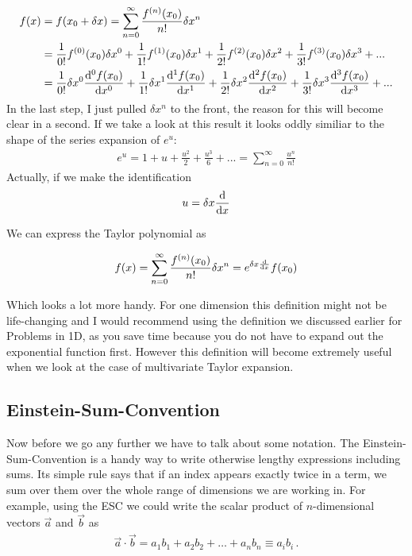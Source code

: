 \begin{align*}
	f(x)&=f(x_0+\delta x)= \sum_{n=0}^\infty \frac{f^{(n)}(x_0)}{n!}\delta x^n\\
		&= \frac{1}{0!}f^{(0)}(x_0)\delta x^0 + \frac{1}{1!} f^{(1)}(x_0)\delta x^1 +  \frac{1}{2!}f^{(2)}(x_0)\delta x^2 + \frac{1}{3!} f^{(3)}(x_0)\delta x^3 + ...\\
	&= \frac{1}{0!}\delta x^0 \dv[0]{f(x_0)}{x} + \frac{1}{1!} \delta x^1\dv[1]{f(x_0)}{x} +  \frac{1}{2!}\delta x^2\dv[2]{f(x_0)}{x} + \frac{1}{3!} \delta x^3\dv[3]{f(x_0)}{x} + ...\\
\end{align*}
In the last step, I just pulled $\delta x^n$ to the front, the reason for this will become clear in a second. If we take a look at this result it looks oddly similiar to the shape of the series expansion of $e^u$:
\begin{align}
	e^u = 1+u+\frac{u^2}{2}+\frac{u^3}{6}+... = \sum_{n=0}^{\infty} \frac{u^n}{n!}
\end{align}
Actually, if we make the identification
\begin{align*}
	u = \delta x \dv{}{x}
\end{align*}

We can express the Taylor polynomial as 

\begin{align}
f(x)&= \sum_{n=0}^\infty \frac{f^{(n)}(x_0)}{n!}\delta x^n = e^{\delta x \dv{}{x}}f(x_0)\\
\end{align}

Which looks a lot more handy. For one dimension this definition might not be life-changing and I would recommend using the definition we discussed earlier for Problems in 1D, as you save time because you do not have to expand out the exponential function first. However this definition will become extremely useful when we look at the case of multivariate Taylor expansion. 
\subsection{Einstein-Sum-Convention}
Now before we go any further we have to talk about some notation. The Einstein-Sum-Convention is a handy way to write otherwise lengthy expressions including sums. Its simple rule says that if an index appears exactly twice in a term, we sum over them over the whole range of dimensions we are working in. For example, using the ESC we could write the scalar product of $n$-dimensional vectors $\vec{a}$ and $\vec{b}$ as 
\begin{align}
	\vec{a}\cdot\vec{b} = a_1b_1+a_2b_2+\dots+a_nb_n \equiv a_ib_i \,.
\end{align}

